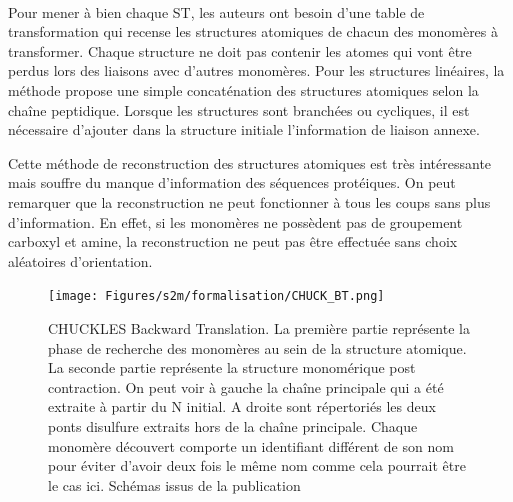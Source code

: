 \documentclass[12pt,french,twoside]{report}
\begin{document}
\paragraph{}Pour mener à bien chaque ST, les auteurs ont besoin d'une table de transformation qui recense les structures atomiques de chacun des monomères à transformer.
Chaque structure ne doit pas contenir les atomes qui vont être perdus lors des liaisons avec d'autres monomères.
Pour les structures linéaires, la méthode propose une simple concaténation des structures atomiques selon la chaîne peptidique.
Lorsque les structures sont branchées ou cycliques, il est nécessaire d'ajouter dans la structure initiale l'information de liaison annexe.

Cette méthode de reconstruction des structures atomiques est très intéressante mais souffre du manque d'information des séquences protéiques.
On peut remarquer que la reconstruction ne peut fonctionner à tous les coups sans plus d'information.
En effet, si les monomères ne possèdent pas de groupement carboxyl et amine, la reconstruction ne peut pas être effectuée sans choix aléatoires d'orientation.

\begin{figure}[!ht]
  \begin{center}
    \texttt{[image: Figures/s2m/formalisation/CHUCK\_BT.png]}
    \caption{\label{chuck_bt}CHUCKLES Backward Translation.
    La première partie représente la phase de recherche des monomères au sein de la structure atomique.
    La seconde partie représente la structure monomérique post contraction.
    On peut voir à gauche la chaîne principale qui a été extraite à partir du N initial.
    A droite sont répertoriés les deux ponts disulfure extraits hors de la chaîne principale.
    Chaque monomère découvert comporte un identifiant différent de son nom pour éviter d'avoir deux fois le même nom comme cela pourrait être le cas ici.
    Schémas issus de la publication}
  \end{center}
\end{figure}
\end{document}
